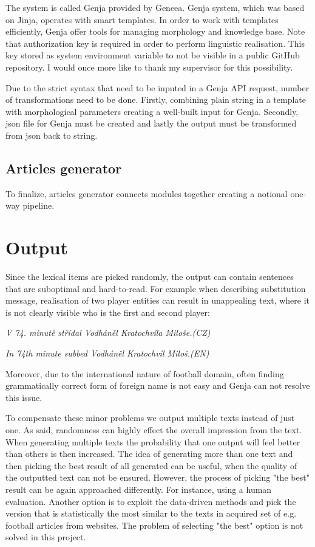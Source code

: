 The system is called Genja provided by Geneea. Genja system, which was based on Jinja, operates with smart templates. In order to work with templates efficiently, Genja offer tools for managing morphology and knowledge base. Note that authorization key is required in order to perform linguistic realisation. This key stored as system environment variable to not be visible in a public GitHub repository. I would once more like to thank my supervisor for this possibility.

Due to the strict syntax that need to be inputed in a Genja API request, number of transformations need to be done. Firstly, combining plain string in a template with morphological parameters creating a well-built input for Genja. Secondly, json file for Genja must be created and lastly the output must be transformed from json back to string.

\subsection{Articles generator}
To finalize, articles generator connects modules together creating a notional one-way pipeline. 

\section{Output}
Since the lexical items are picked randomly, the output can contain sentences that are suboptimal and hard-to-read. For example when describing substitution message, realisation of two player entities can result in unappealing text, where it is not clearly visible who is the first and second player:
\begin{center}
	\textit{V 74. minutě střídal Vodháněl Kratochvíla Miloše.(CZ)}
\end{center}
\begin{center}
	\textit{In 74th minute subbed Vodháněl Kratochvíl Miloš.(EN)}
\end{center}
Moreover, due to the international nature of football domain, often finding grammatically correct form of foreign name is not easy and Genja can not resolve this issue. 

To compensate these minor problems we output multiple texts instead of just one. As said, randomness can highly effect the overall impression from the text. When generating multiple texts the probability that one output will feel better than others is then increased. The idea of generating more than one text and then picking the best result of all generated can be useful, when the quality of the outputted text can not be ensured. However, the process of picking "the best" result can be again approached differently. For instance, using a human evaluation. Another option is to exploit the data-driven methods and pick the version that is statistically the most similar to the texts in acquired set of e.g. football articles from websites. The problem of selecting "the best" option is not solved in this project. 

